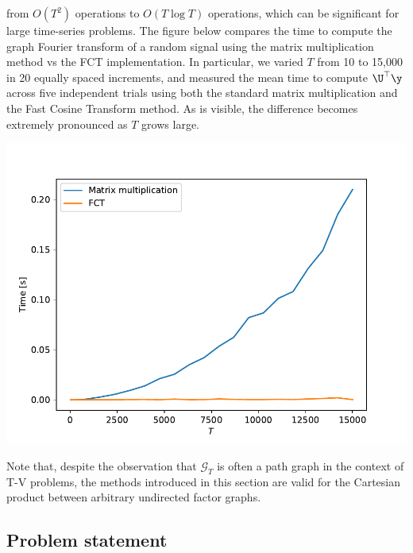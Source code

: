 {    from $O(T^2)$ operations to $O(T \log T)$ operations, which can be significant for large time-series problems. The figure below compares the time to compute the graph Fourier transform of a random signal using the matrix multiplication method vs the FCT implementation. In particular, we varied $T$ from 10 to 15,000 in 20 equally spaced increments, and measured the mean time to compute $\U^\top \y$ across five independent trials using both the standard matrix multiplication and the Fast Cosine Transform method. As is visible, the difference becomes extremely pronounced as $T$ grows large.

    \begin{center}
        \includegraphics[width=\linewidth]{Figures/DCT.pdf}
    \end{center}



}



Note that, despite the observation that $\mathcal{G}_T$ is often a path graph in the context of T-V problems, the methods introduced in this section are valid for the Cartesian product between arbitrary undirected factor graphs.

\subsection{Problem statement}

